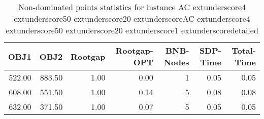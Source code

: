 \begin{table}
\caption{Non-dominated points statistics for instance AC	extunderscore4	extunderscore50	extunderscore20	extunderscoreAC	extunderscore4	extunderscore50	extunderscore20	extunderscore1	extunderscoredetailed}
\label{tab:stats/AC_4_50_20_AC_4_50_20_1_detailed}
\begin{tabular}{rrrrrrr}
\toprule
OBJ1 & OBJ2 & Rootgap & Rootgap-OPT & BNB-Nodes & SDP-Time & Total-Time \\
\midrule
522.00 & 883.50 & 1.00 & 0.00 & 1 & 0.05 & 0.05 \\
608.00 & 551.50 & 1.00 & 0.14 & 5 & 0.08 & 0.08 \\
632.00 & 371.50 & 1.00 & 0.07 & 5 & 0.05 & 0.05 \\
\bottomrule
\end{tabular}
\end{table}

